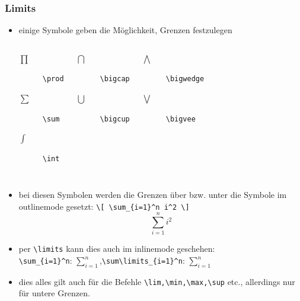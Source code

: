 \begin{frame}[fragile]
\frametitle{Limits}
\begin{itemize}
  \item<1-> einige Symbole geben die Möglichkeit, Grenzen festzulegen
  \begin{columns}
  \begin{description}
    \item[$\prod$] \lstinline[style=Latex]+\prod+
    \item[$\sum$] \lstinline[style=Latex]+\sum+
    \item[$\int$] \lstinline[style=Latex]+\int+
  \end{description}
  \begin{description}
    \item[$\bigcap$] \lstinline[style=Latex]+\bigcap+
    \item[$\bigcup$] \lstinline[style=Latex]+\bigcup+
  \end{description}
  \begin{description}    
    \item[$\bigwedge$] \lstinline[style=Latex]+\bigwedge+
    \item[$\bigvee$] \lstinline[style=Latex]+\bigvee+
  \end{description}
  \end{columns}
  \item<2-> bei diesen Symbolen werden die Grenzen über bzw. unter die Symbole im outlinemode gesetzt: \lstinline[style=Latex]+\[ \sum_{i=1}^n i^2 \]+
  \[ \sum_{i=1}^n i^2 \]
  \item<3-> per \lstinline[style=Latex]+\limits+ kann dies auch im inlinemode geschehen:\\
  \lstinline[style=Latex]+\sum_{i=1}^n+: $\sum_{i=1}^n$\pause,\quad \lstinline[style=Latex]+\sum\limits_{i=1}^n+: $\sum\limits_{i=1}^n$
  \item<4-> dies alles gilt auch für die Befehle \lstinline[style=Latex]+\lim,\min,\max,\sup+ etc., allerdings nur für untere Grenzen.
\end{itemize}
\end{frame}

